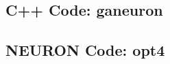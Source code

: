 \begin{table}[tp]
 \centering
 \caption{Comparison of Best genomes trained with different
   inputs.  Target genome and each {GA} best genomes were run 100
   times. One thousand genomes were run with different inputs in the 1
   step and 5 step parameter variation population.}\label{tab:GA:5}

%  
 \end{table}


\subsection{C++ Code: \textsf{ganeuron}}\label{sec:GA:cpp-code}

\subsection{NEURON Code: \textsf{opt4}}\label{sec:GA:neuron-code}




\clearpage


